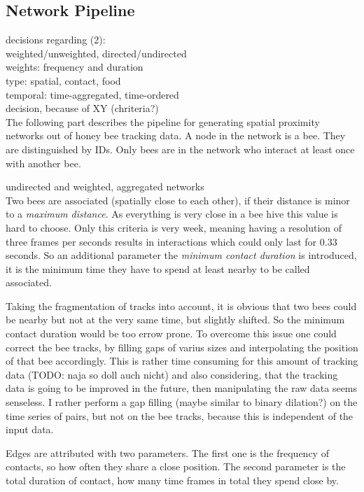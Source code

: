 \subsection{Network Pipeline}
decisions regarding (2):\\
weighted/unweighted, directed/undirected\\
weights: frequency and duration\\
type: spatial, contact, food\\
temporal: time-aggregated, time-ordered\\
decision, because of XY (chriteria?)\\


The following part describes the pipeline for generating spatial proximity networks out of honey bee tracking data. A node in the network is a bee. They are distinguished by IDs. Only bees are in the network who interact at least once with another bee.

undirected and weighted, aggregated networks\\

Two bees are associated (spatially close to each other), if their distance is minor to a \emph{maximum distance}. As everything is very close in a bee hive this value is hard to choose. Only this criteria is very week, meaning having a resolution of three frames per seconds results in interactions which could only last for $0.33$ seconds. So an additional parameter the \emph{minimum contact duration} is introduced, it is the minimum time they have to spend at least nearby to be called associated.

Taking the fragmentation of tracks into account, it is obvious that two bees could be nearby but not at the very same time, but slightly shifted. So the minimum contact duration would be too errow prone. To overcome this issue one could correct the bee tracks, by filling gaps of varius sizes and interpolating the position of that bee accordingly. This is rather time consuming for this amount of tracking data (TODO: naja so doll auch nicht) and also considering, that the tracking data is going to be improved in the future, then manipulating the raw data seems senseless. I rather perform a gap filling (maybe similar to binary dilation?) on the time series of pairs, but not on the bee tracks, because this is independent of the input data.

Edges are attributed with two parameters. The first one is the frequency of contacts, so how often they share a close position. The second parameter is the total duration of contact, how many time frames in total they spend close by.

